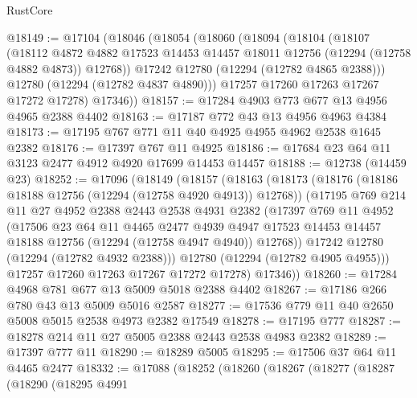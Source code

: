 \begin{lexlean}{RustCore}
\begin{coremodule}
@18149 := @17104
    (@18046
      (@18054
        (@18060
          (@18094
            (@18104
              (@18107
                (@18112
                  @4872
                  @4882
                  @17523
                  @14453
                  @14457
                  @18011
                  @12756
                  (@12294 (@12758 @4882 @4873))
                  @12768))
              @17242
              @12780
              (@12294 (@12782 @4865 @2388)))
            @12780
            (@12294 (@12782 @4837 @4890)))
          @17257
          @17260
          @17263
          @17267
          @17272
          @17278)
        @17346))
@18157 := @17284 @4903 @773 @677 @13 @4956 @4965 @2388 @4402
@18163 := @17187 @772 @43 @13 @4956 @4963 @4384
@18173 := @17195 @767 @771 @11 @40 @4925 @4955 @4962 @2538 @1645 @2382
@18176 := @17397 @767 @11 @4925
@18186 := @17684 @23 @64 @11 @3123 @2477 @4912 @4920 @17699 @14453 @14457
@18188 := @12738 (@14459 @23)
@18252 := @17096
    (@18149
      (@18157
        (@18163
          (@18173
            (@18176 (@18186 @18188 @12756 (@12294 (@12758 @4920 @4913)) @12768))
            (@17195
              @769
              @214
              @11
              @27
              @4952
              @2388
              @2443
              @2538
              @4931
              @2382
              (@17397
                @769
                @11
                @4952
                (@17506
                  @23
                  @64
                  @11
                  @4465
                  @2477
                  @4939
                  @4947
                  @17523
                  @14453
                  @14457
                  @18188
                  @12756
                  (@12294 (@12758 @4947 @4940))
                  @12768))
              @17242
              @12780
              (@12294 (@12782 @4932 @2388)))
            @12780
            (@12294 (@12782 @4905 @4955)))
          @17257
          @17260
          @17263
          @17267
          @17272
          @17278)
        @17346))
@18260 := @17284 @4968 @781 @677 @13 @5009 @5018 @2388 @4402
@18267 := @17186 @266 @780 @43 @13 @5009 @5016 @2587
@18277 := @17536 @779 @11 @40 @2650 @5008 @5015 @2538 @4973 @2382 @17549
@18278 := @17195 @777
@18287 := @18278 @214 @11 @27 @5005 @2388 @2443 @2538 @4983 @2382
@18289 := @17397 @777 @11
@18290 := @18289 @5005
@18295 := @17506 @37 @64 @11 @4465 @2477
@18332 := @17088
    (@18252
      (@18260
        (@18267
          (@18277
            (@18287
              (@18290
                (@18295
                  @4991

\end{coremodule}
\end{lexlean}

